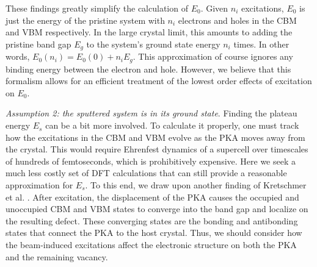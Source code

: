 \documentclass{article}
\begin{document}
These findings greatly simplify the calculation of $E_0$.
Given $n_i$ excitations, $E_0$ is just the energy of the pristine system with
$n_i$ electrons and holes in the CBM and VBM respectively.
In the large crystal limit, this amounts to adding the pristine band gap $E_g$
to the system's ground state energy $n_i$ times.
In other words, $E_0(n_i) = E_0(0) + n_iE_g$.
This approximation of course ignores any binding energy between the electron
and hole.
However, we believe that this formalism allows for an efficient treatment of
the lowest order effects of excitation on $E_0$.

\medskip\noindent
\textit{Assumption 2: the sputtered system is in its ground state}.
Finding the plateau energy $E_s$ can be a bit more involved. To calculate it
properly, one must track how the excitations in the CBM and VBM evolve as the
PKA moves away from the crystal. This would require Ehrenfest dynamics of a
supercell over timescales of hundreds of femtoseconds, which is prohibitively
expensive.
Here we seek a much less costly set of DFT calculations that can still provide
a reasonable approximation for $E_s$.
To this end, we draw upon another finding of Kretschmer et al.
\cite{Kretschmer2020}.
After excitation, the displacement of the PKA causes the occupied and
unoccupied CBM and VBM states to converge into the band gap and localize on the
resulting defect.
These converging states are the bonding and antibonding states that connect the
PKA to the host crystal.
Thus, we should consider how the beam-induced excitations affect the electronic
structure on both the PKA and the remaining vacancy.
\end{document}
